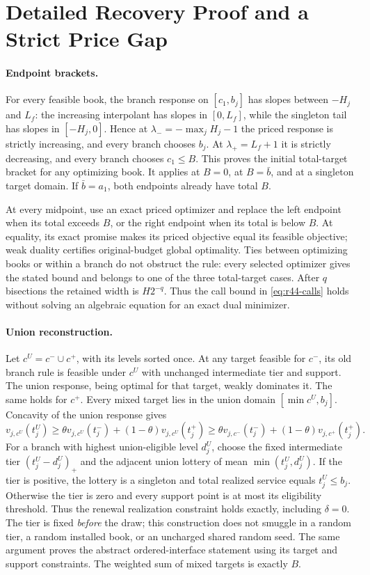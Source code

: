 \section{Detailed Recovery Proof and a Strict Price Gap}\label{sec:r44-proof}
\paragraph{Endpoint brackets.}
For every feasible book, the branch response on $[c_1,b_j]$ has slopes between $-H_j$ and $L_f$: the increasing interpolant has slopes in $[0,L_f]$, while the singleton tail has slopes in $[-H_j,0]$. Hence at $\lambda_-=-\max_jH_j-1$ the priced response is strictly increasing, and every branch chooses $b_j$. At $\lambda_+=L_f+1$ it is strictly decreasing, and every branch chooses $c_1\leq B$. This proves the initial total-target bracket for any optimizing book. It applies at $B=0$, at $B=\bar b$, and at a singleton target domain. If $\bar b=a_1$, both endpoints already have total $B$.

At every midpoint, use an exact priced optimizer and replace the left endpoint when its total exceeds $B$, or the right endpoint when its total is below $B$. At equality, its exact promise makes its priced objective equal its feasible objective; weak duality certifies original-budget global optimality. Ties between optimizing books or within a branch do not obstruct the rule: every selected optimizer gives the stated bound and belongs to one of the three total-target cases. After $q$ bisections the retained width is $H2^{-q}$. Thus the call bound in \eqref{eq:r44-calls} holds without solving an algebraic equation for an exact dual minimizer.

\paragraph{Union reconstruction.}
Let $c^U=c^-\cup c^+$, with its levels sorted once. At any target feasible for $c^-$, its old branch rule is feasible under $c^U$ with unchanged intermediate tier and support. The union response, being optimal for that target, weakly dominates it. The same holds for $c^+$. Every mixed target lies in the union domain $[\min c^U,b_j]$. Concavity of the union response gives
\begin{equation}\label{eq:r44-union-concavity}
 v_{j,c^U}(t_j^U)\geq
 \theta v_{j,c^U}(t_j^-)+(1-\theta)v_{j,c^U}(t_j^+)
 \geq\theta v_{j,c^-}(t_j^-)+(1-\theta)v_{j,c^+}(t_j^+).
\end{equation}
For a branch with highest union-eligible level $d_j^U$, choose the fixed intermediate tier $(t_j^U-d_j^U)_+$ and the adjacent union lottery of mean $\min(t_j^U,d_j^U)$. If the tier is positive, the lottery is a singleton and total realized service equals $t_j^U\leq b_j$. Otherwise the tier is zero and every support point is at most its eligibility threshold. Thus the renewal realization constraint holds exactly, including $\delta=0$. The tier is fixed \emph{before} the draw; this construction does not smuggle in a random tier, a random installed book, or an uncharged shared random seed. The same argument proves the abstract ordered-interface statement using its target and support constraints. The weighted sum of mixed targets is exactly $B$.

